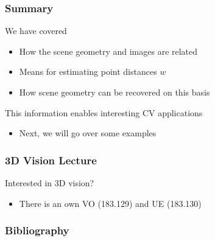 \documentclass[xetex,professionalfont]{beamer}
\begin{document}

\begin{frame}
\frametitle{Summary}

We have covered
\begin{itemize}
    \item How the scene geometry and images are related
    \item Means for estimating point distances $w$
    \item How scene geometry can be recovered on this basis
\end{itemize}

\bigskip
This information enables interesting CV applications
\begin{itemize}
    \item Next, we will go over some examples
\end{itemize}

\end{frame}


\begin{frame}
\frametitle{3D Vision Lecture}

Interested in 3D vision?
\begin{itemize}
    \item There is an own VO (183.129) and UE (183.130)
\end{itemize}

\end{frame}


\begin{frame}
\frametitle{Bibliography}

\printbibliography

\end{frame}
\end{document}
